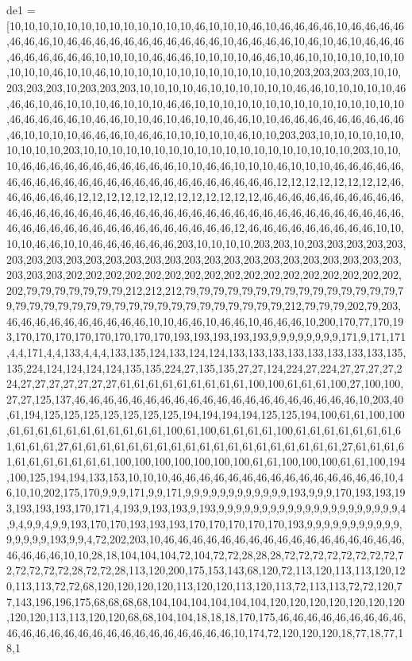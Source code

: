 de1 = [10,10,10,10,10,10,10,10,10,10,10,10,10,46,10,10,10,46,10,46,46,46,46,10,46,46,46,46,46,46,46,10,46,46,46,46,46,46,46,46,46,46,46,10,46,46,46,46,10,46,10,46,10,46,46,46,46,46,46,46,46,46,10,10,10,10,46,46,46,10,10,10,10,46,46,10,46,10,10,10,10,10,10,10,10,10,10,46,10,10,46,10,10,10,10,10,10,10,10,10,10,10,10,10,203,203,203,203,10,10,203,203,203,10,203,203,203,10,10,10,10,46,10,10,10,10,10,10,46,46,10,10,10,10,10,46,46,46,10,46,10,10,10,46,10,10,10,46,46,10,10,10,10,10,10,10,10,10,10,10,10,10,10,10,46,46,46,46,46,10,46,46,10,10,46,10,46,10,10,46,46,10,10,46,46,46,46,46,46,46,46,46,46,10,10,10,10,46,46,46,10,46,46,10,10,10,10,10,46,10,10,203,203,10,10,10,10,10,10,10,10,10,10,203,10,10,10,10,10,10,10,10,10,10,10,10,10,10,10,10,10,10,10,203,10,10,10,46,46,46,46,46,46,46,46,46,46,46,10,10,46,46,10,10,10,46,10,10,10,46,46,46,46,46,46,46,46,46,46,46,46,46,46,46,46,46,46,46,46,46,46,46,46,12,12,12,12,12,12,12,12,46,46,46,46,46,46,12,12,12,12,12,12,12,12,12,12,12,12,12,46,46,46,46,46,46,46,46,46,46,46,46,46,46,46,46,46,46,46,46,46,46,46,46,46,46,46,46,46,46,46,46,46,46,46,46,46,46,46,46,46,46,46,46,46,46,46,46,46,46,46,46,46,46,12,46,46,46,46,46,46,46,46,46,10,10,10,10,46,46,10,10,46,46,46,46,46,46,203,10,10,10,10,203,203,10,203,203,203,203,203,203,203,203,203,203,203,203,203,203,203,203,203,203,203,203,203,203,203,203,203,203,203,203,202,202,202,202,202,202,202,202,202,202,202,202,202,202,202,202,202,202,79,79,79,79,79,79,79,212,212,212,79,79,79,79,79,79,79,79,79,79,79,79,79,79,79,79,79,79,79,79,79,79,79,79,79,79,79,79,79,79,79,79,79,79,79,212,79,79,79,202,79,203,46,46,46,46,46,46,46,46,46,46,10,10,46,46,10,46,46,10,46,46,46,10,200,170,77,170,193,170,170,170,170,170,170,170,170,193,193,193,193,193,9,9,9,9,9,9,9,9,171,9,171,171,4,4,171,4,4,133,4,4,4,133,135,124,133,124,124,133,133,133,133,133,133,133,133,135,135,224,124,124,124,124,135,135,224,27,135,135,27,27,124,224,27,224,27,27,27,27,224,27,27,27,27,27,27,27,61,61,61,61,61,61,61,61,61,100,100,61,61,61,100,27,100,100,27,27,125,137,46,46,46,46,46,46,46,46,46,46,46,46,46,46,46,46,46,46,46,46,10,203,40,61,194,125,125,125,125,125,125,125,194,194,194,194,125,125,194,100,61,61,100,100,61,61,61,61,61,61,61,61,61,61,61,100,61,100,61,61,61,61,100,61,61,61,61,61,61,61,61,61,61,61,27,61,61,61,61,61,61,61,61,61,61,61,61,61,61,61,61,61,61,61,27,61,61,61,61,61,61,61,61,61,61,61,100,100,100,100,100,100,100,61,61,100,100,100,61,61,100,194,100,125,194,194,133,153,10,10,10,46,46,46,46,46,46,46,46,46,46,46,46,46,46,46,10,46,10,10,202,175,170,9,9,9,171,9,9,171,9,9,9,9,9,9,9,9,9,9,9,9,193,9,9,9,170,193,193,193,193,193,193,170,171,4,193,9,193,193,9,193,9,9,9,9,9,9,9,9,9,9,9,9,9,9,9,9,9,9,9,9,9,4,9,4,9,9,4,9,9,193,170,170,193,193,193,170,170,170,170,170,193,9,9,9,9,9,9,9,9,9,9,9,9,9,9,9,9,193,9,9,4,72,202,203,10,46,46,46,46,46,46,46,46,46,46,46,46,46,46,46,46,46,46,46,46,46,10,10,28,18,104,104,104,72,104,72,72,28,28,28,72,72,72,72,72,72,72,72,72,72,72,72,72,28,72,72,28,113,120,200,175,153,143,68,120,72,113,120,113,113,120,120,113,113,72,72,68,120,120,120,120,113,120,120,113,120,113,72,113,113,72,72,120,77,143,196,196,175,68,68,68,68,104,104,104,104,104,104,120,120,120,120,120,120,120,120,120,113,113,120,120,68,68,104,104,18,18,18,170,175,46,46,46,46,46,46,46,46,46,46,46,46,46,46,46,46,46,46,46,46,46,46,46,46,46,10,174,72,120,120,120,18,77,18,77,18,1